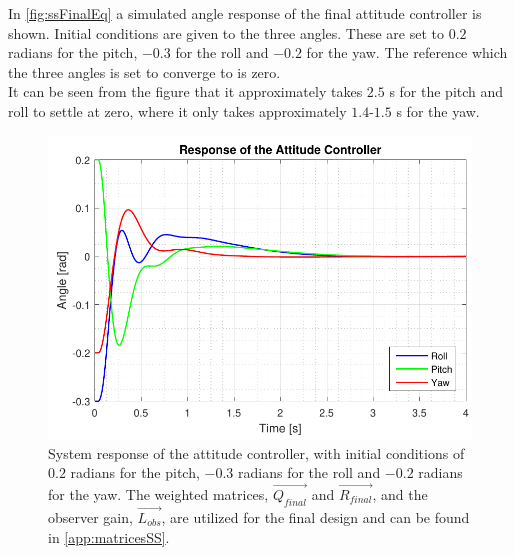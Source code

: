 In \autoref{fig:ssFinalEq} a simulated angle response of the final attitude controller is shown. Initial conditions are given to the three angles. These are set to $0.2$ radians for the pitch, $-0.3$ for the roll and $-0.2$ for the yaw. The reference which the three angles is set to converge to is zero. \\ It can be seen from the figure that it approximately takes $2.5$ \si{s} for the pitch and roll to settle at zero, where it only takes approximately $1.4$-$1.5$ \si{s} for the yaw.
%
\begin{figure}[H]
	\centering
	\includegraphics[scale=0.8]{figures/ssFinalEq.pdf}
	\caption{System response of the attitude controller, with initial conditions of $0.2$ radians for the pitch, $-0.3$ radians for the roll and $-0.2$ radians for the yaw. The weighted matrices, $\vec{Q_{final}}$ and $\vec{R_{final}}$, and the observer gain, $\vec{L_{obs}}$, are utilized for the final design and can be found in \autoref{app:matricesSS}.}
	\label{fig:ssFinalEq}
\end{figure}
%
